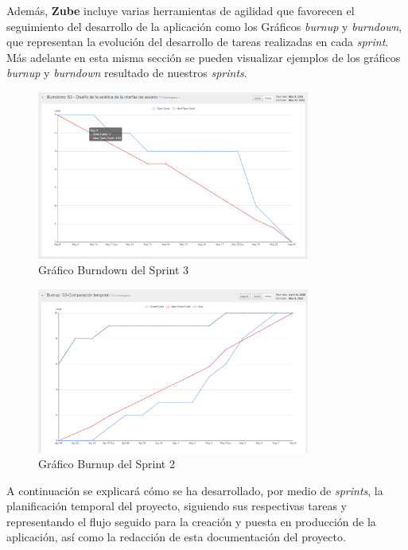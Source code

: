  Además, \textbf{Zube} incluye varias herramientas de agilidad que favorecen el seguimiento del desarrollo de la aplicación como los Gráficos \textit{burnup} y \textit{burndown}, que representan la evolución del desarrollo de tareas realizadas en cada \textit{sprint}. Más adelante en esta misma sección se pueden visualizar ejemplos de los gráficos \textit{burnup} y \textit{burndown} resultado de nuestros \textit{sprints}.
\begin{figure}[H]
\centering
\includegraphics[width=0.8\textwidth]{img/BurndownS3.png}
\caption{Gráfico Burndown del Sprint 3}
\label{fig:BurndownS3}
\end{figure}

\begin{figure}[H]
\centering
\includegraphics[width=0.8\textwidth]{img/BurnupS2.png}
\caption{Gráfico Burnup del Sprint 2}
\label{fig:BurnupS2}
\end{figure}

 A continuación se explicará cómo se ha desarrollado, por medio de \textit{sprints}, la planificación temporal del proyecto, siguiendo sus respectivas tareas y representando el flujo seguido para la creación y puesta en producción de la aplicación, así como la redacción de esta documentación del proyecto.

